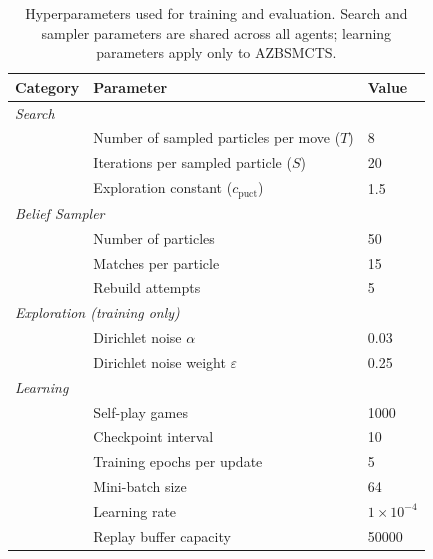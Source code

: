 \documentclass[12pt,oneside,openright]{article}
\begin{document}
\begin{table}[H]
  \centering
  \caption{Hyperparameters used for training and evaluation. Search and sampler parameters are shared across all agents; learning parameters apply only to AZBSMCTS.}
  \label{tab:hyperparams}
  \begin{tabularx}{\textwidth}{l l X}
    \toprule
    \textbf{Category} & \textbf{Parameter}                         & \textbf{Value}     \\
    \midrule
    \multicolumn{3}{l}{\textit{Search}}                                                 \\
                      & Number of sampled particles per move ($T$) & 8                  \\
                      & Iterations per sampled particle ($S$)      & 20                 \\
                      & Exploration constant ($c_\text{puct}$)     & 1.5                \\
    \midrule
    \multicolumn{3}{l}{\textit{Belief Sampler}}                                         \\
                      & Number of particles                        & 50                 \\
                      & Matches per particle                       & 15                 \\
                      & Rebuild attempts                           & 5                  \\
    \midrule
    \multicolumn{3}{l}{\textit{Exploration (training only)}}                            \\
                      & Dirichlet noise $\alpha$                   & 0.03               \\
                      & Dirichlet noise weight $\varepsilon$       & 0.25               \\
    \midrule
    \multicolumn{3}{l}{\textit{Learning}}                                               \\
                      & Self-play games                            & 1000               \\
                      & Checkpoint interval                        & 10                 \\
                      & Training epochs per update                 & 5                  \\
                      & Mini-batch size                            & 64                 \\
                      & Learning rate                              & $1 \times 10^{-4}$ \\
                      & Replay buffer capacity                     & 50000              \\
    \bottomrule
  \end{tabularx}
\end{table}
\end{document}

